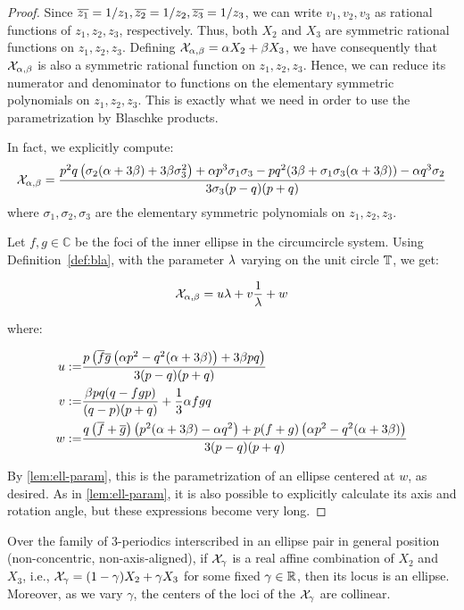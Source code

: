 \begin{proof}
Since $\overline{z_1}=1/z_1,\overline{z_2}=1/z_2,\overline{z_3}=1/z_3$, we can write $v_1,v_2,v_3$ as rational functions of $z_1,z_2,z_3$, respectively. Thus, both $X_2$ and $X_3$ are symmetric rational functions on $z_1,z_2,z_3$. Defining $\mathcal{X}_{\alpha,\beta}=\alpha X_2+\beta X_3$, we have consequently that $\mathcal{X}_{\alpha,\beta}$ is also a symmetric rational function on $z_1,z_2,z_3$. Hence, we can reduce its numerator and denominator to functions on the elementary symmetric polynomials on $z_1,z_2,z_3$. This is exactly what we need in order to use the parametrization by Blaschke products.

In fact, we explicitly compute:
\[  \mathcal{X}_{\alpha,\beta}= \frac{p^2 q \left(\sigma_2 (\alpha +3 \beta )+3 \beta  \sigma_3^2\right)+\alpha  p^3 \sigma_1 \sigma_3-p q^2 (3 \beta +\sigma_1 \sigma_3 (\alpha +3 \beta ))-\alpha  q^3 \sigma_2}{3 \sigma_3 (p-q) (p+q)}\]
where $\sigma_1,\sigma_2,\sigma_3$ are the elementary symmetric polynomials on $z_1,z_2,z_3$.

Let $f,g\in\mathbb{C}$ be the foci of the inner ellipse in the circumcircle system. Using Definition~\ref{def:bla}, with the parameter $\lambda$ varying on the unit circle $\mathbb{T}$, we get:

\begin{equation}
\mathcal{X}_{\alpha,\beta}= u \lambda+v\frac{1}{\lambda}+w
\label{eqn:xi-param}
\end{equation}

\noindent where:

\begin{align*}
    u:=&\frac{p \left(\overline{f} \overline{g} \left(\alpha  p^2-q^2 (\alpha +3 \beta )\right)+3 \beta  p q\right)}{3 (p-q) (p+q)}\\
    v:=&\frac{\beta  p q (q-f g p)}{(q-p) (p+q)}+\frac{1}{3} \alpha  f g q\\
    w:=&\frac{q \left(\overline{f}+\overline{g}\right) \left(p^2 (\alpha +3 \beta )-\alpha  q^2\right)+p (f+g) \left(\alpha  p^2-q^2 (\alpha +3 \beta )\right)}{3 (p-q) (p+q)}
\end{align*}

By   \cref{lem:ell-param}, this is the parametrization of an ellipse centered at $w$, as desired. As in  \cref{lem:ell-param}, it is also possible to explicitly calculate its axis and rotation angle, but these expressions become very long.
\end{proof}

\begin{corollary}
Over the family of 3-periodics interscribed in an ellipse pair in general position (non-concentric, non-axis-aligned),
if $\mathcal{X}_\gamma$ is a real affine combination of $X_2$ and $X_3$, i.e., $\mathcal{X}_\gamma=(1-\gamma) X_2+\gamma X_3$ for some fixed $\gamma\in\mathbb{R}$, then its locus is an ellipse. Moreover, as we vary $\gamma$, the centers of the loci of the $\mathcal{X}_\gamma$ are collinear.
\end{corollary}

